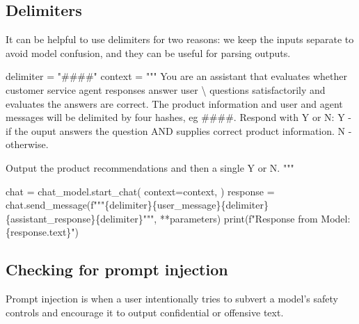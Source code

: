 \documentclass[
  letterpaper,
  DIV=11,
  numbers=noendperiod]{scrreprt}
\newenvironment{Shaded}{\begin{snugshade}}{\end{snugshade}}
\newcommand{\BuiltInTok}[1]{\textcolor[rgb]{0.00,0.23,0.31}{#1}}
\newcommand{\CharTok}[1]{\textcolor[rgb]{0.13,0.47,0.30}{#1}}
\newcommand{\NormalTok}[1]{\textcolor[rgb]{0.00,0.23,0.31}{#1}}
\newcommand{\OperatorTok}[1]{\textcolor[rgb]{0.37,0.37,0.37}{#1}}
\newcommand{\SpecialCharTok}[1]{\textcolor[rgb]{0.37,0.37,0.37}{#1}}
\newcommand{\SpecialStringTok}[1]{\textcolor[rgb]{0.13,0.47,0.30}{#1}}
\newcommand{\StringTok}[1]{\textcolor[rgb]{0.13,0.47,0.30}{#1}}
\begin{document}
\hypertarget{delimiters}{%
\subsection{Delimiters}\label{delimiters}}

It can be helpful to use delimiters for two reasons: we keep the inputs
separate to avoid model confusion, and they can be useful for parsing
outputs.

\begin{Shaded}
\begin{Highlighting}[]
\NormalTok{delimiter }\OperatorTok{=} \StringTok{"\#\#\#\#"}
\NormalTok{context }\OperatorTok{=} \StringTok{"""}
\StringTok{You are an assistant that evaluates whether customer service agent responses answer user }\CharTok{\textbackslash{}}
\StringTok{questions satisfactorily and evaluates the answers are correct.}
\StringTok{The product information and user and agent messages will be delimited by four}
\StringTok{hashes, eg \#\#\#\#.}
\StringTok{Respond with Y or N:}
\StringTok{Y {-} if the ouput answers the question AND supplies correct product information.}
\StringTok{N {-} otherwise.}

\StringTok{Output the product recommendations and then a single Y or N.}
\StringTok{"""}

\NormalTok{chat }\OperatorTok{=}\NormalTok{ chat\_model.start\_chat(}
\NormalTok{    context}\OperatorTok{=}\NormalTok{context,}
\NormalTok{)}
\NormalTok{response }\OperatorTok{=}\NormalTok{ chat.send\_message(}\SpecialStringTok{f"""}\SpecialCharTok{\{}\NormalTok{delimiter}\SpecialCharTok{\}\{}\NormalTok{user\_message}\SpecialCharTok{\}\{}\NormalTok{delimiter}\SpecialCharTok{\}\{}\NormalTok{assistant\_response}\SpecialCharTok{\}\{}\NormalTok{delimiter}\SpecialCharTok{\}}\SpecialStringTok{"""}\NormalTok{, }\OperatorTok{**}\NormalTok{parameters)}
\BuiltInTok{print}\NormalTok{(}\SpecialStringTok{f"Response from Model: }\SpecialCharTok{\{}\NormalTok{response}\SpecialCharTok{.}\NormalTok{text}\SpecialCharTok{\}}\SpecialStringTok{"}\NormalTok{)}
\end{Highlighting}
\end{Shaded}

\hypertarget{checking-for-prompt-injection}{%
\subsection{Checking for prompt
injection}\label{checking-for-prompt-injection}}

Prompt injection is when a user intentionally tries to subvert a model's
safety controls and encourage it to output confidential or offensive
text.
\end{document}
